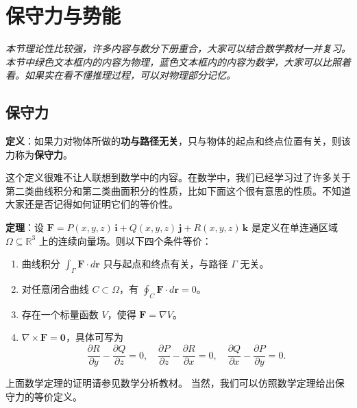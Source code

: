 \section{保守力与势能}
\textit{本节理论性比较强，许多内容与数分下册重合，大家可以结合数学教材一并复习。本节中绿色文本框内的内容为物理，蓝色文本框内的内容为数学，大家可以比照着看。如果实在看不懂推理过程，可以对物理部分记忆。}
\subsection{保守力}
\begin{tcolorbox}[colback=white!5!white,colframe=green!50!black,title=保守力的定义]
    \textbf{定义}：如果力对物体所做的\textbf{功与路径无关}，只与物体的起点和终点位置有关，则该力称为\textbf{保守力}。

\end{tcolorbox}
这个定义很难不让人联想到数学中的内容。在数学中，我们已经学习过了许多关于第二类曲线积分和第二类曲面积分的性质，比如下面这个很有意思的性质。不知道大家还是否记得如何证明它们的等价性。
\begin{tcolorbox}[colback=white!5!white, colframe=blue!75!black, title=曲线积分与路径无关的等价条件]
    \textbf{定理}：设 \(\mathbf{F} = P(x,y,z)\,\mathbf{i} + Q(x,y,z)\,\mathbf{j} + R(x,y,z)\,\mathbf{k}\) 是定义在单连通区域 \(\Omega \subseteq \mathbb{R}^3\) 上的连续向量场。则以下四个条件等价：
    \begin{enumerate}
        \item 曲线积分 \(\int_{\Gamma} \mathbf{F}\cdot d\mathbf{r}\) 只与起点和终点有关，与路径 \(\Gamma\) 无关。
        \item 对任意闭合曲线 \(C \subset \Omega\)，有 \(\oint_{C} \mathbf{F}\cdot d\mathbf{r} = 0\)。
        \item 存在一个标量函数 \(V\)，使得 \(\mathbf{F} = \nabla V\)。
        \item \(\nabla \times \mathbf{F} = \mathbf{0}\)，具体可写为
              \[
                  \frac{\partial R}{\partial y} - \frac{\partial Q}{\partial z} = 0,\quad
                  \frac{\partial P}{\partial z} - \frac{\partial R}{\partial x} = 0,\quad
                  \frac{\partial Q}{\partial x} - \frac{\partial P}{\partial y} = 0.
              \]
    \end{enumerate}
\end{tcolorbox}

上面数学定理的证明请参见数学分析教材。
当然，我们可以仿照数学定理给出保守力的等价定义。

